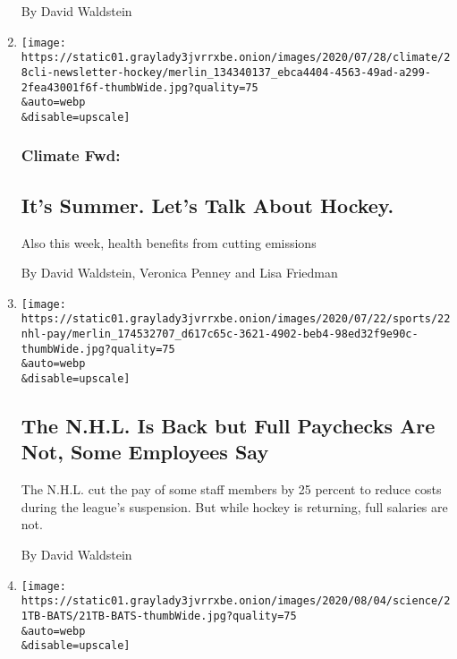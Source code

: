 \begin{enumerate}
  By David Waldstein
\item
  \href{/2020/07/29/climate/skating-hockey-climate-change.html}{}

  \texttt{[image: https://static01.graylady3jvrrxbe.onion/images/2020/07/28/climate/28cli-newsletter-hockey/merlin\_134340137\_ebca4404-4563-49ad-a299-2fea43001f6f-thumbWide.jpg?quality=75\\\&auto=webp\\\&disable=upscale]}

  \hypertarget{climate-fwd}{%
  \subsubsection{Climate Fwd:}\label{climate-fwd}}

  \hypertarget{its-summer-lets-talk-about-hockey}{%
  \subsection{It's Summer. Let's Talk About
  Hockey.}\label{its-summer-lets-talk-about-hockey}}

  Also this week, health benefits from cutting emissions

  By David Waldstein, Veronica Penney and Lisa Friedman
\item
  \href{/2020/07/22/sports/hockey/nhl-pay-cut-employees-restart.html}{}

  \texttt{[image: https://static01.graylady3jvrrxbe.onion/images/2020/07/22/sports/22nhl-pay/merlin\_174532707\_d617c65c-3621-4902-beb4-98ed32f9e90c-thumbWide.jpg?quality=75\\\&auto=webp\\\&disable=upscale]}

  \hypertarget{the-nhl-is-back-but-full-paychecks-are-not-some-employees-say}{%
  \subsection{The N.H.L. Is Back but Full Paychecks Are Not, Some
  Employees
  Say}\label{the-nhl-is-back-but-full-paychecks-are-not-some-employees-say}}

  The N.H.L. cut the pay of some staff members by 25 percent to reduce
  costs during the league's suspension. But while hockey is returning,
  full salaries are not.

  By David Waldstein
\item
  \href{/2020/07/22/science/vampire-bats-viruses.html}{}

  \texttt{[image: https://static01.graylady3jvrrxbe.onion/images/2020/08/04/science/21TB-BATS/21TB-BATS-thumbWide.jpg?quality=75\\\&auto=webp\\\&disable=upscale]}


\end{enumerate}
